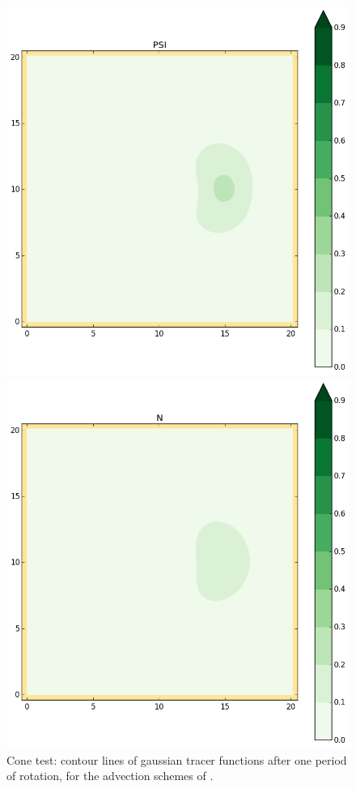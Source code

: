 \begin{figure}[h!]
\begin{minipage}[t]{0.50\textwidth}
\end{minipage}
\begin{minipage}[t]{0.50\textwidth}
 \centering
 \includegraphics[trim=19mm 19mm 35mm 21mm,clip,scale=0.28]{../img/figure_PSI.png}
\end{minipage}%
\begin{minipage}[t]{0.50\textwidth}
 \centering
 \includegraphics[trim=19mm 19mm 35mm 21mm,clip,scale=0.28]{../img/figure_N.png}
\end{minipage}
 \caption{Cone test: contour lines of gaussian tracer functions after one period of rotation, for the advection schemes of .}
 \label{t2d:cone:profiles2}
\end{figure}
